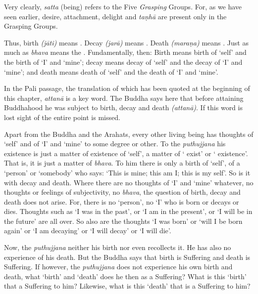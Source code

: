 Very clearly, \emph{satta} (being) refers to the Five \emph{Grasping} Groups. For, as we have seen earlier, desire, attachment, delight and \emph{taṇhā} are present only in the Grasping Groups.

Thus, birth \emph{(jāti)} means . Decay \emph{(jarā)} means . Death \emph{(maraṇa)} means . Just as much as \emph{bhava} means the . Fundamentally, then: Birth means birth of `self' and the birth of `I' and `mine'; decay means decay of `self' and the decay of `I' and `mine'; and death means death of `self' and the death of `I' and `mine'.

In the Pali passage, the translation of which has been quoted at the beginning of this chapter, \emph{attanā} is a key word. The Buddha says here that before attaining Buddhahood he was subject to birth, decay and death  \emph{(attanā)}. If this word is lost sight of the entire point is missed.

Apart from the Buddha and the Arahats, every other living being has thoughts of `self' and of `I' and `mine' to some degree or other. To the \emph{puthujjana} his existence is just a matter of existence of `self', a matter of ` exist' or ` existence'. That is, it is just a matter of \emph{bhava}. To him there is only a birth of `self', of a `person' or `somebody' who says: `This is mine; this am I; this is my self'. So is it with decay and death. Where there are no thoughts of `I' and `mine' whatever, no thoughts or feelings of subjectivity, no \emph{bhava}, the question of birth, decay and death does not arise. For, there is no `person', no `I' who is born or decays or dies. Thoughts such as `I was in the past', or `I am in the present', or `I will be in the future' are all over. So also are the thoughts `I was born' or `will I be born again' or `I am decaying' or `I will decay' or `I will die'.

Now, the \emph{puthujjana} neither  his birth nor even recollects it. He has also no experience of his death. But the Buddha says that birth is Suffering and death is Suffering. If however, the \emph{puthujjana} does not experience his own birth and death, what `birth' and `death' does he then  as a Suffering? What is this `birth' that  a Suffering to him? Likewise, what is this `death' that is a Suffering to him?

